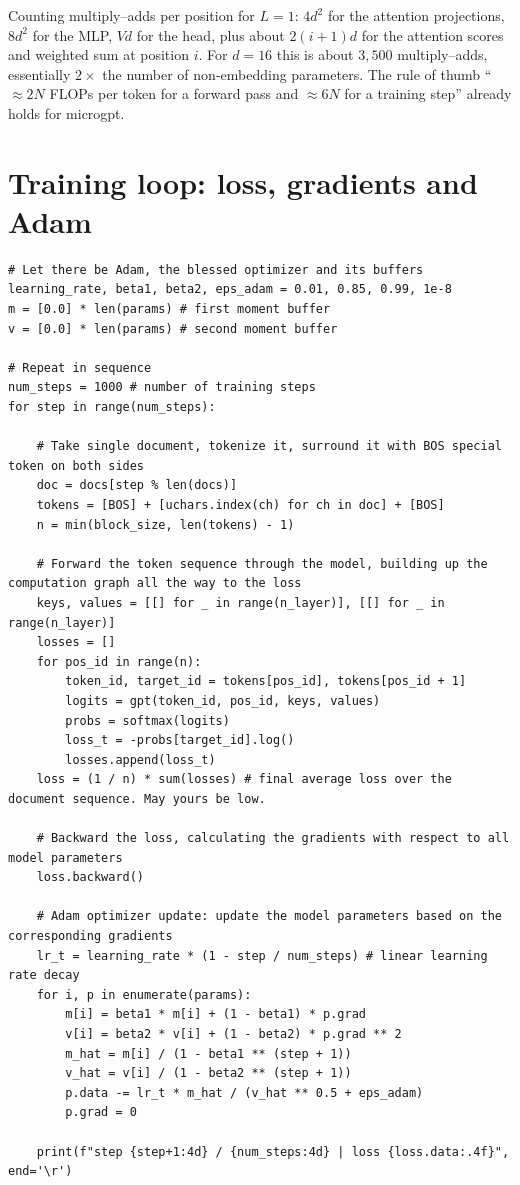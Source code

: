 \documentclass[11pt,letterpaper]{article}
\theoremstyle{remark}
\begin{document}
Counting multiply--adds per position for $L=1$: $4d^2$ for the attention projections, $8d^2$ for the MLP, $Vd$ for the head, plus about $2(i{+}1)d$ for the attention scores and weighted sum at position $i$. For $d=16$ this is about $3{,}500$ multiply--adds, essentially $2\times$ the number of non-embedding parameters. The rule of thumb ``$\approx 2N$ FLOPs per token for a forward pass and $\approx 6N$ for a training step'' \parencite{kaplan2020scaling} already holds for microgpt.

\section{Training loop: loss, gradients and Adam}
\label{sec:training}

\begin{lstlisting}
# Let there be Adam, the blessed optimizer and its buffers
learning_rate, beta1, beta2, eps_adam = 0.01, 0.85, 0.99, 1e-8
m = [0.0] * len(params) # first moment buffer
v = [0.0] * len(params) # second moment buffer

# Repeat in sequence
num_steps = 1000 # number of training steps
for step in range(num_steps):

    # Take single document, tokenize it, surround it with BOS special token on both sides
    doc = docs[step % len(docs)]
    tokens = [BOS] + [uchars.index(ch) for ch in doc] + [BOS]
    n = min(block_size, len(tokens) - 1)

    # Forward the token sequence through the model, building up the computation graph all the way to the loss
    keys, values = [[] for _ in range(n_layer)], [[] for _ in range(n_layer)]
    losses = []
    for pos_id in range(n):
        token_id, target_id = tokens[pos_id], tokens[pos_id + 1]
        logits = gpt(token_id, pos_id, keys, values)
        probs = softmax(logits)
        loss_t = -probs[target_id].log()
        losses.append(loss_t)
    loss = (1 / n) * sum(losses) # final average loss over the document sequence. May yours be low.

    # Backward the loss, calculating the gradients with respect to all model parameters
    loss.backward()

    # Adam optimizer update: update the model parameters based on the corresponding gradients
    lr_t = learning_rate * (1 - step / num_steps) # linear learning rate decay
    for i, p in enumerate(params):
        m[i] = beta1 * m[i] + (1 - beta1) * p.grad
        v[i] = beta2 * v[i] + (1 - beta2) * p.grad ** 2
        m_hat = m[i] / (1 - beta1 ** (step + 1))
        v_hat = v[i] / (1 - beta2 ** (step + 1))
        p.data -= lr_t * m_hat / (v_hat ** 0.5 + eps_adam)
        p.grad = 0

    print(f"step {step+1:4d} / {num_steps:4d} | loss {loss.data:.4f}", end='\r')
\end{lstlisting}
\end{document}
